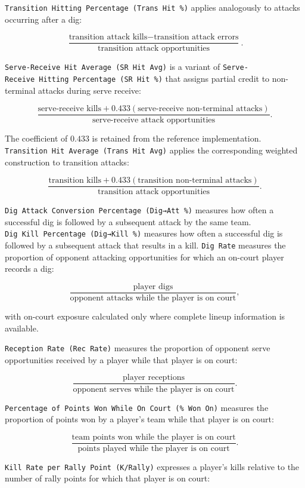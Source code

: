 \documentclass[
  12pt]{article}
\begin{document}
\texttt{Transition\ Hitting\ Percentage\ (Trans\ Hit\ \%)} applies
analogously to attacks occurring after a dig:

\[
\frac{
\text{transition attack kills}-\text{transition attack errors}
}{
\text{transition attack opportunities}
}.
\]

\texttt{Serve-Receive\ Hit\ Average\ (SR\ Hit\ Avg)} is a variant of
\texttt{Serve-Receive\ Hitting\ Percentage\ (SR\ Hit\ \%)} that assigns
partial credit to non-terminal attacks during serve receive:

\[
\frac{
\text{serve-receive kills}
+
0.433(\text{serve-receive non-terminal attacks})
}{
\text{serve-receive attack opportunities}
}.
\]

The coefficient of \(0.433\) is retained from the reference
implementation. \texttt{Transition\ Hit\ Average\ (Trans\ Hit\ Avg)}
applies the corresponding weighted construction to transition attacks:

\[
\frac{
\text{transition kills}
+
0.433(\text{transition non-terminal attacks})
}{
\text{transition attack opportunities}
}.
\]

\texttt{Dig\ Attack\ Conversion\ Percentage\ (Dig→Att\ \%)} measures how
often a successful dig is followed by a subsequent attack by the same
team. \texttt{Dig\ Kill\ Percentage\ (Dig→Kill\ \%)} measures how often
a successful dig is followed by a subsequent attack that results in a
kill. \texttt{Dig\ Rate} measures the proportion of opponent attacking
opportunities for which an on-court player records a dig:

\[
\frac{
\text{player digs}
}{
\text{opponent attacks while the player is on court}
},
\]

with on-court exposure calculated only where complete lineup information
is available.

\texttt{Reception\ Rate\ (Rec\ Rate)} measures the proportion of
opponent serve opportunities received by a player while that player is
on court:

\[
\frac{
\text{player receptions}
}{
\text{opponent serves while the player is on court}
}.
\]

\texttt{Percentage\ of\ Points\ Won\ While\ On\ Court\ (\%\ Won\ On)}
measures the proportion of points won by a player's team while that
player is on court:

\[
\frac{
\text{team points won while the player is on court}
}{
\text{points played while the player is on court}
}.
\]

\texttt{Kill\ Rate\ per\ Rally\ Point\ (K/Rally)} expresses a player's
kills relative to the number of rally points for which that player is on
court:
\end{document}
